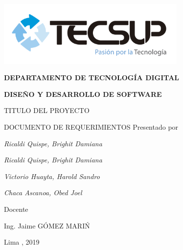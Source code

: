 \begin{titlepage}
	\centering
	\includegraphics[width=0.70\textwidth]{img/logo_tecsup_final}\par\vspace{1cm}
	\vspace{0.30cm}	
	{\scshape\large\bfseries DEPARTAMENTO DE TECNOLOG\'IA DIGITAL \par}
	\vspace{0.60cm}	
	{\scshape\large\bfseries DISEÑO Y DESARROLLO DE SOFTWARE  \par}
	\vspace{2.00cm}		
	{\large\large TITULO DEL PROYECTO \par}
	\vspace{0.60cm}
	{\scshape\large DOCUMENTO DE REQUERIMIENTOS }
	\vspace{0.60cm}
	\vfill
	Presentado por \par
		{\large\itshape { Ricaldi Quispe, Brighit Damiana}\par}
	
	{\large\itshape { Ricaldi Quispe, Brighit Damiana}\par}
	\vspace{0.20cm}
	{\large\itshape { Victorio Huayta, Harold Sandro}\par}
	\vspace{0.20cm}
	{\large\itshape { Chaca Ascanoa, Obed Joel}\par}
	\vspace{0.30cm}
	\vfill
	Docente \par
	Ing. Jaime  \textsc{ G\'OMEZ MARI\'N}
	
  \vspace{0.30cm}
	\vfill
        {\large Lima , 2019 \par}
\end{titlepage}

